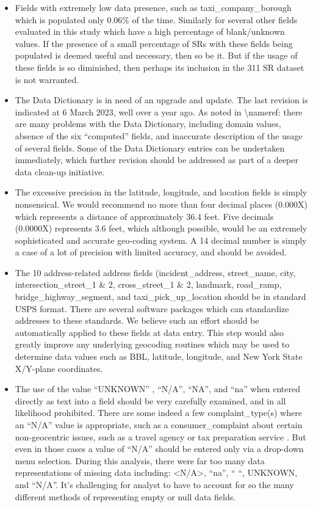 \documentclass[12pt, titlepage]{article}
\begin{document}
{\begin{itemize}
	\item Fields with extremely low data presence, such as taxi\_company\_borough 
	which is populated only 0.06\% of the time. Similarly for several other 
	fields evaluated in this study which have a high percentage of blank/unknown 
	values. If the presence of a small percentage of SRs with these fields 
	being populated is deemed useful and necessary, then so be it. But if 
	the usage of these fields is so diminished, then perhaps its inclusion 
	in the 311 SR dataset is not warranted.
	
	\item The Data Dictionary is in need of an upgrade and update. The last 
	revision is indicated at 6 March 2023, well over a year ago. 	As noted 
	in \textbackslash nameref:  there are many 
	problems with the Data Dictionary, including domain values, absence of 
	the six ``computed'' fields, and inaccurate description of the usage of 
	several fields. Some of the Data Dictionary entries can be undertaken 
	immediately, which further revision should be addressed as part of 
	a deeper data clean-up initiative. 
	
	\item The excessive precision in the latitude, longitude, and location 
	fields is simply nonsensical.  We would recommend no more than 
	four decimal places (0.000X) which represents a distance of approximately 
	36.4 feet. Five decimals (0.0000X) represents 3.6 feet, which although 
	possible, would be an extremely sophisticated and accurate 
	geo-coding system. A 14 decimal number is simply a case of a lot 
	of precision with limited accuracy, and should be avoided.

	\item The 10 address-related address fields (incident\_address, 
	street\_name, city, intersection\_street\_1 \& 2, cross\_street\_1 \& 2,  
	landmark, road\_ramp, bridge\_highway\_segment, and 
	taxi\_pick\_up\_location should be in standard USPS format. There 
	are several software packages which can standardize addresses to 
	these standards. We believe such an effort should be automatically 
	applied to these fields at data entry. This step would also greatly 
	improve any underlying geocoding routines which 	may be used 
	to determine data values such as BBL, latitude, longitude, and New 
	York State X/Y-plane coordinates.
	
	\item The use of the value ``UNKNOWN'' , ``N/A'', ``NA'', and ``na'' when 
	entered directly as text into a field should be very carefully examined, 
	and in all likelihood prohibited.  There are some indeed a few 
	complaint\_type(s) where an ``N/A'' value is appropriate, such 
	as a consumer\_complaint about certain non-geocentric issues, such 
	as a travel agency or tax preparation service . But even in those cases 
	a value of ``N/A'' should be entered only via a drop-down menu 
	selection. During this analysis, there were far too many data 
	representations of missing data including: <N/A>, ``na'', `` ``, UNKNOWN, 
	and ``N/A''. It's challenging for analyst to have to account for so 
	the many different methods of representing empty or null data fields. 
	

\end{itemize}}
\end{document}
